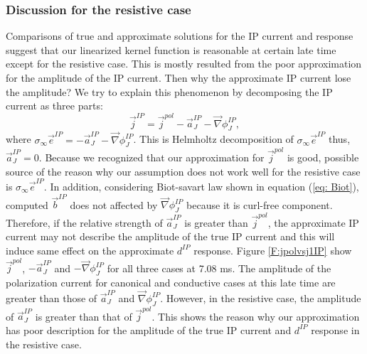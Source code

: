 \documentclass[a4paper, 11pt]{article}
\newcommand{\grad}{\vec \nabla}
\newcommand{\siginf}{\sigma_\infty}
\renewcommand {\j}  { {\vec j} }
\renewcommand {\b}  { {\vec b} }
\newcommand {\e}  { {\vec e} }
\newcommand{\dip}{d^{IP}}
\begin{document}
\subsubsection{Discussion for the resistive case}
Comparisons of true and approximate solutions for the IP current and response suggest that our linearized kernel function is reasonable at certain late time except for the resistive case. This is mostly resulted from the poor approximation for the amplitude of the IP current. Then why the approximate IP current lose the amplitude? We try to explain this phenomenon by decomposing the IP current as three parts:
\begin{equation}
  \j^{IP} = \j^{pol} -\vec{a}^{IP}_J-\grad \phi^{IP}_J, 
\end{equation}
where $\siginf\e^{IP} = -\vec{a}^{IP}_J - \grad \phi^{IP}_J$. This is Helmholtz decomposition of $\siginf\e^{IP}$ thus, $\vec{a}^{IP}_J = 0$. Because we recognized that our approximation for  $\j^{pol}$ is good, possible source of the reason why our assumption does not work well for the resistive case is $\siginf \e^{IP}$. In addition, considering Biot-savart law shown in equation (\ref{eq: Biot}), computed $\b^{IP}$ does not affected by $\grad \phi^{IP}_J$ because it is curl-free component. Therefore, if the relative strength of $\vec{a}^{IP}_J$ is greater than $\j^{pol}$, the approximate IP current may not describe the amplitude of the true IP current and this will induce same effect on the approximate $\dip$ response. Figure \ref{F:jpolvsj1IP} show $\j^{pol}$, $-\vec{a}^{IP}_J$ and $-\grad \phi^{IP}_J$ for all three cases at 7.08 ms. The amplitude of the polarization current for canonical and conductive cases at this late time are greater than those of  $\vec{a}^{IP}_J$ and $\grad \phi^{IP}_J$. However, in the resistive case, the amplitude of $\vec{a}^{IP}_J$ is greater than that of $\j^{pol}$. This shows the reason why our approximation has poor description for the amplitude of the true IP current and $\dip$ response in the resistive case. 
\end{document}
